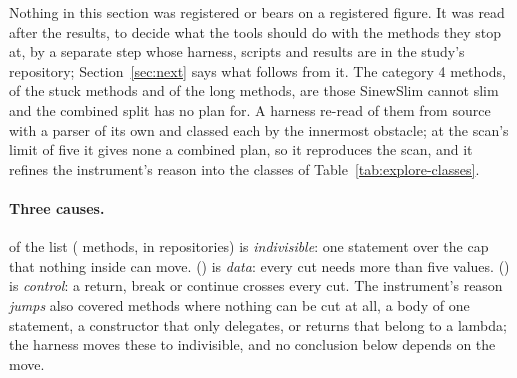 \documentclass[11pt,a4paper]{article}
\newcommand{\fitwidth}[1]{\resizebox{\ifdim\width>\textwidth\textwidth\else\width\fi}{!}{#1}}
\begin{document}
Nothing in this section was registered or bears on a registered figure. It
was read after the results, to decide what the tools should do with the
methods they stop at, by a separate step whose harness, scripts and results
are in the study's repository; Section~\ref{sec:next} says what follows
from it. The
\catFourC{} category 4 methods, \catFourCShare{} of the stuck methods and
\exRateOverall{} of the long methods, are those SinewSlim cannot slim and
the combined split has no plan for. A harness re-read \exReread{} of them
from source with a parser of its own and classed each by the innermost
obstacle; at the scan's limit of five it gives none a combined plan, so it
reproduces the scan, and it refines the instrument's reason into the classes
of Table~\ref{tab:explore-classes}.

\begin{table}[t]
\centering\small
\caption{Exploratory: the category 4 methods by class, the largest classes grouped by family. \emph{Top ten} is the share of the class held by the ten repositories with the most of it, beside the same repositories' share of all long methods (what size alone predicts); \emph{dispersion} is 1 when the class is spread as the long methods are and higher when clustered; \emph{cognitive per line} is the class's median cognitive complexity \cite{campbell2018} per code line.}
\label{tab:explore-classes}
\fitwidth{}
\end{table}

\paragraph{Three causes.} \exIndivisibleShare{} of the list (\exIndivisible{}
methods, in \exIndivisibleRepos{} repositories) is \emph{indivisible}: one
statement over the cap that nothing inside can move. \exDataShare{}
(\exData{}) is \emph{data}: every cut needs more than five values.
\exControlShare{} (\exControl{}) is \emph{control}: a return, break or
continue crosses every cut. The instrument's reason \emph{jumps} also covered
\exRegrouped{} methods where nothing can be cut at all, a body of one
statement, a constructor that only delegates, or returns that belong to a
lambda; the harness moves these to indivisible, and no conclusion below
depends on the move.
\end{document}
